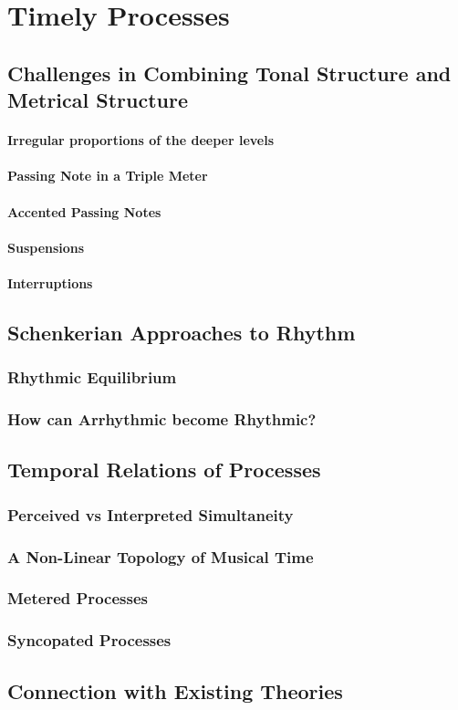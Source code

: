 \chapter{Timely Processes}
    \section{Challenges in Combining Tonal Structure and Metrical Structure}
        \subsubsection{Irregular proportions of the deeper levels}
        \subsubsection{Passing Note in a Triple Meter}
        \subsubsection{Accented Passing Notes}
        \subsubsection{Suspensions}
        \subsubsection{Interruptions}

    \section{Schenkerian Approaches to Rhythm}
        \subsection{Rhythmic Equilibrium}
        \subsection{How can Arrhythmic become Rhythmic?}
        
    \section{Temporal Relations of Processes}
        \subsection{Perceived vs Interpreted Simultaneity}
        \subsection{A Non-Linear Topology of Musical Time}
        \subsection{Metered Processes}
        \subsection{Syncopated Processes}

    \section{Connection with Existing Theories}